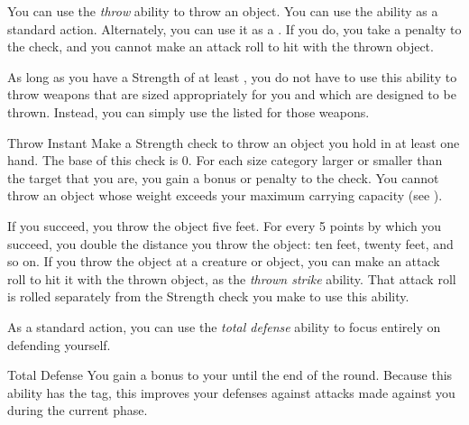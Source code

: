          You can use the \textit{throw} ability to throw an object.
        You can use the ability as a standard action.
        Alternately, you can use it as a .
        If you do, you take a  penalty to the check, and you cannot make an attack roll to hit with the thrown object.

        As long as you have a Strength of at least , you do not have to use this ability to throw weapons that are sized appropriately for you and which are designed to be thrown.
        Instead, you can simply use the listed  for those weapons.

        \begin{instantability}{Throw}
            \label{Throw}
            Instant
            \rankline
            Make a Strength check to throw an object you hold in at least one hand.
            The base  of this check is 0.
            For each size category larger or smaller than the target that you are, you gain a  bonus or penalty to the check.
            You cannot throw an object whose weight exceeds your maximum carrying capacity (see ).

            If you succeed, you throw the object five feet.
            For every 5 points by which you succeed, you double the distance you throw the object: ten feet, twenty feet, and so on.
            If you throw the object at a creature or object, you can make an attack roll to hit it with the thrown object, as the \textit{thrown strike} ability.
            That attack roll is rolled separately from the Strength check you make to use this ability.
        \end{instantability}

         As a standard action, you can use the \textit{total defense} ability to focus entirely on defending yourself.

        \begin{durationability}{Total Defense}
            \label{Total Defense}
            \rankline
            You gain a  bonus to your  until the end of the round.
            Because this ability has the  tag, this improves your defenses against attacks made against you during the current phase.
        \end{durationability}

